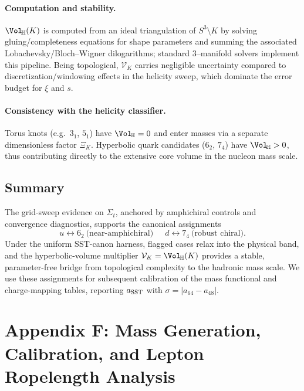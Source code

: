 \documentclass[11pt, preprint,titlepage]{revtex4-2}
\begin{document}
		\paragraph{Computation and stability.}
		\(\Vol_{\!\mathbb{H}}(K)\) is computed from an ideal triangulation of \(S^3\!\setminus\!K\) by solving gluing/completeness equations for shape parameters and summing the associated Lobachevsky/Bloch–Wigner dilogarithms; standard 3–manifold solvers implement this pipeline. Being topological, \(\mathcal V_K\) carries negligible uncertainty compared to discretization/windowing effects in the helicity sweep, which dominate the error budget for \(\xi\) and \(s\).

		\paragraph{Consistency with the helicity classifier.}
		Torus knots (e.g.\ \(3_1\), \(5_1\)) have \(\Vol_{\!\mathbb{H}}=0\) and enter masses via a separate dimensionless factor \(\Xi_K\). Hyperbolic quark candidates (\(6_2\), \(7_4\)) have \(\Vol_{\!\mathbb{H}}>0\), thus contributing directly to the extensive core volume in the nucleon mass scale.

		\subsection*{Summary}
		The grid-sweep evidence on \(\Sigma_t\), anchored by amphichiral controls and convergence diagnostics, supports the canonical assignments
		\[
		\boxed{u\!\leftrightarrow\!6_2\ \text{(near-amphichiral)}\quad\ \ d\!\leftrightarrow\!7_4\ \text{(robust chiral)}}.
		\]
		Under the uniform SST-canon harness, flagged cases relax into the physical band, and the hyperbolic-volume multiplier \(\mathcal V_K=\Vol_{\!\mathbb{H}}(K)\) provides a stable, parameter-free bridge from topological complexity to the hadronic mass scale. We use these assignments for subsequent calibration of the mass functional and charge-mapping tables, reporting \(a_{\rm SST}\) with \(\sigma=|a_{64}-a_{48}|\).

	\section*{Appendix F: Mass Generation, Calibration, and Lepton Ropelength Analysis}
	\label{sec:calibration_hierarchy}
\end{document}
